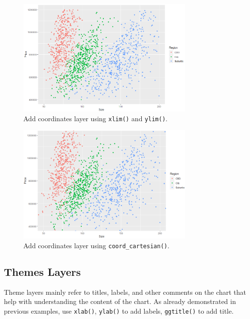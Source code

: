 \begin{figure}
	\centering
	\includegraphics[width=250pt]{chapters/ch-r/figures/coordinate_demo1.png}
	\caption{Add coordinates layer using \texttt{xlim()} and \texttt{ylim()}.} \label{ch:r1:fig:coordinate_demo1}
\end{figure}

\begin{figure}
	\centering
	\includegraphics[width=250pt]{chapters/ch-r/figures/coordinate_demo2.png}
	\caption{Add coordinates layer using \texttt{coord_cartesian()}.} \label{ch:r1:fig:coordinate_demo2}
\end{figure}

\subsection{Themes Layers}

Theme layers mainly refer to titles, labels, and other comments on the chart that help with understanding the content of the chart. As already demonstrated in previous examples, use \verb|xlab()|, \verb|ylab()| to add labels, \verb|ggtitle()| to add title.

